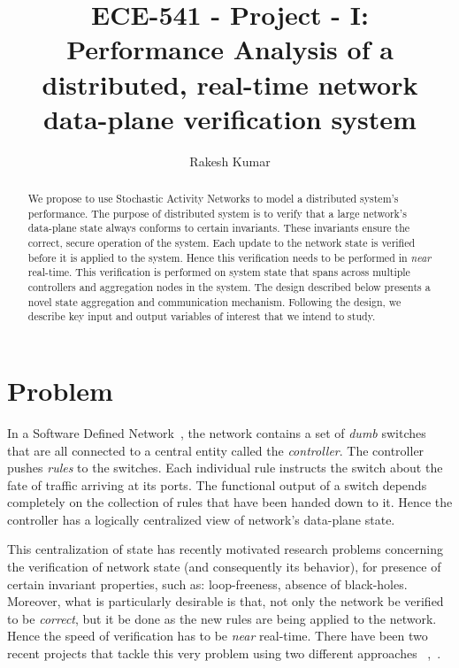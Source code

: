 \documentclass[a4paper,10pt]{article}
\title{ECE-541 - Project - I: \protect\\
Performance Analysis of a distributed, real-time network data-plane verification system}
\author{Rakesh Kumar}
\begin{document}
\maketitle

\begin{abstract}

We propose to use Stochastic Activity Networks to model a distributed system's performance. The purpose of distributed system is to verify that a large network's data-plane state always conforms to certain invariants. These invariants ensure the correct, secure operation of the system. Each update to the network state is verified before it is applied to the system. Hence this verification needs to be performed in \textit{near} real-time. This verification is performed on system state that spans across multiple controllers and aggregation nodes in the system. The design described below presents a novel state aggregation and communication mechanism. Following the design, we describe key input and output variables of interest that we intend to study. 

\end{abstract}

\section{Problem}

In a Software Defined Network~\cite{openflow}, the network contains a set of \textit{dumb} switches that are all connected to a central entity called the \textit{controller}. The controller pushes \textit{rules} to the switches. Each individual rule instructs the switch  about the fate of traffic arriving at its ports. The functional output of a switch depends completely on the collection of rules that have been handed down to it. Hence the controller has a logically centralized view of network's data-plane state.

This centralization of state has recently motivated research problems concerning the verification of network state (and consequently its behavior), for presence of certain invariant properties, such as: loop-freeness, absence of black-holes. Moreover, what is particularly desirable is that, not only the network be verified to be \textit{correct}, but it be done as the new rules are being applied to the network. Hence the speed of verification has to be \textit{near} real-time. There have been two recent projects that tackle this very problem using two different approaches ~\cite{veriflownsdi},~\cite{netplumber}.
\end{document}
